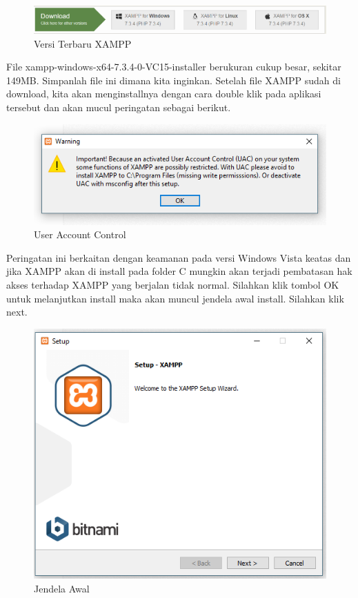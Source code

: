 \begin{figure}[h]
\centering
\includegraphics[scale=0.5]{figures/xampp}
\caption{Versi Terbaru XAMPP}
\end{figure}

File xampp-windows-x64-7.3.4-0-VC15-installer berukuran cukup besar, sekitar 149MB. Simpanlah file ini dimana kita inginkan.
Setelah file XAMPP sudah di download, kita akan menginstallnya dengan cara double klik pada aplikasi tersebut dan akan mucul peringatan sebagai berikut.

 \begin{figure}[h]
\centering
\includegraphics[scale=0.5]{figures/uac}
\caption{User Account Control}
\end{figure}

Peringatan ini berkaitan dengan keamanan pada versi Windows Vista keatas dan jika XAMPP akan di install pada folder C mungkin akan terjadi pembatasan hak akses terhadap XAMPP yang berjalan tidak normal. Silahkan klik tombol OK untuk melanjutkan install maka akan muncul jendela awal install. Silahkan klik next.

 \begin{figure}[h]
\centering
\includegraphics[scale=0.5]{figures/jendelaawal}
\caption{Jendela Awal}
\end{figure}

